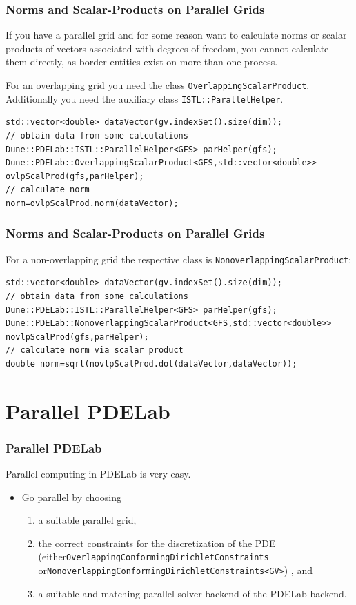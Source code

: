 \documentclass[aspectratio=169,11pt]{beamer}
\theoremstyle{definition}
\begin{document}
\begin{frame}[fragile]
  \frametitle<presentation>{Norms and Scalar-Products on Parallel Grids}
If you have a parallel grid and for some reason want to calculate norms or scalar products of vectors associated with degrees of freedom, you cannot calculate them directly, as border entities exist on more than one process.

For an overlapping grid you need the class \lstinline!OverlappingScalarProduct!. Additionally you need the auxiliary class \lstinline!ISTL::ParallelHelper!.
\begin{lstlisting}[breaklines=true]
std::vector<double> dataVector(gv.indexSet().size(dim));
// obtain data from some calculations
Dune::PDELab::ISTL::ParallelHelper<GFS> parHelper(gfs);
Dune::PDELab::OverlappingScalarProduct<GFS,std::vector<double>> ovlpScalProd(gfs,parHelper);
// calculate norm
norm=ovlpScalProd.norm(dataVector);
\end{lstlisting}
\end{frame}

\begin{frame}[fragile]
  \frametitle<presentation>{Norms and Scalar-Products on Parallel Grids}
For a non-overlapping grid the respective class is
\lstinline!NonoverlappingScalarProduct!:
\begin{lstlisting}[breaklines=true]
std::vector<double> dataVector(gv.indexSet().size(dim));
// obtain data from some calculations
Dune::PDELab::ISTL::ParallelHelper<GFS> parHelper(gfs);
Dune::PDELab::NonoverlappingScalarProduct<GFS,std::vector<double>> novlpScalProd(gfs,parHelper);
// calculate norm via scalar product
double norm=sqrt(novlpScalProd.dot(dataVector,dataVector));
\end{lstlisting}
\end{frame}


\section{Parallel PDELab}

\begin{frame}
  \frametitle<presentation>{Parallel PDELab}
Parallel computing in PDELab is very easy.
  \begin{itemize}
  \item Go parallel by choosing
    \begin{enumerate}
    \item a suitable parallel grid,
    \item the correct constraints for the discretization of
      the PDE (either\newline \lstinline!OverlappingConformingDirichletConstraints! or\newline \lstinline!NonoverlappingConformingDirichletConstraints<GV>!) , and
    \item a suitable and matching parallel solver backend of the
      PDELab backend.
    \end{enumerate}
  \end{itemize}
\end{frame}
\end{document}
